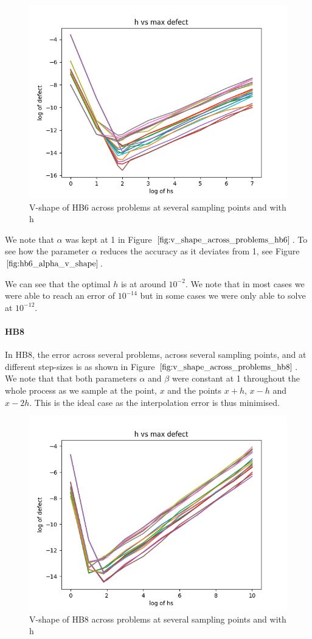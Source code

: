 \documentclass{article}
\begin{document}
\begin{figure}[H]
\centering
\includegraphics[width=0.7\linewidth]{./figures/v_shape_across_problems_hb6}
\caption{V-shape of HB6 across problems at several sampling points and with h}
\label{fig:v_shape_across_problems_hb6}
\end{figure}

We note that $\alpha$ was kept at 1 in Figure $\ref{fig:v_shape_across_problems_hb6}$. To see how the parameter $\alpha$ reduces the accuracy as it deviates from 1, see Figure $\ref{fig:hb6_alpha_v_shape}$.

We can see that the optimal $h$ is at around $10^{-2}$. We note that in most cases we were able to reach an error of $10^{-14}$ but in some cases we were only able to solve at $10^{-12}$. 


\paragraph{HB8}
In HB8, the error across several problems, across several sampling points, and at different step-sizes is as shown in Figure $\ref{fig:v_shape_across_problems_hb8}$. We note that that both parameters $\alpha$ and $\beta$ were constant at 1 throughout the whole process as we sample at the point, $x$ and the points $x+h$, $x-h$ and $x-2h$. This is the ideal case as the interpolation error is thus minimised. 

\begin{figure}[H]
\centering
\includegraphics[width=0.7\linewidth]{./figures/v_shape_across_problems_hb8}
\caption{V-shape of HB8 across problems at several sampling points and with h}
\label{fig:v_shape_across_problems_hb8}
\end{figure}
\end{document}
